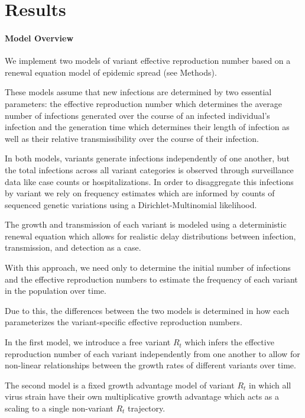 \documentclass[11pt,oneside,letterpaper]{article}
\begin{document}
\section*{Results}

\paragraph{Model Overview}%

We implement two models of variant effective reproduction number based on a renewal equation model of epidemic spread (see Methods).

These models assume that new infections are determined by two essential parameters: the effective reproduction number which determines the average number of infections generated over the course of an infected individual's infection and the generation time which determines their length of infection as well as their relative transmissibility over the course of their infection.

In both models, variants generate infections independently of one another, but the total infections across all variant categories is observed through surveillance data like case counts or hospitalizations. In order to disaggregate this infections by variant we rely on frequency estimates which are informed by counts of sequenced genetic variations using a Dirichlet-Multinomial likelihood.

The growth and transmission of each variant is modeled using a deterministic renewal equation which allows for realistic delay distributions between infection, transmission, and detection as a case.

With this approach, we need only to determine the initial number of infections and the effective reproduction numbers to estimate the frequency of each variant in the population over time.

Due to this, the differences between the two models is determined in how each parameterizes the variant-specific effective reproduction numbers. 

In the first model, we introduce a free variant $R_{t}$ which infers the effective reproduction number of each variant independently from one another to allow for non-linear relationships between the growth rates of different variants over time. 

The second model is a fixed growth advantage model of variant $R_{t}$ in which all virus strain have their own multiplicative growth advantage which acts as a scaling to a single non-variant $R_{t}$ trajectory.
\end{document}
